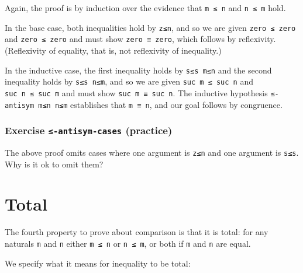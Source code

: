 Again, the proof is by induction over the evidence that \texttt{m\ ≤\ n}
and \texttt{n\ ≤\ m} hold.

In the base case, both inequalities hold by \texttt{z≤n}, and so we are
given \texttt{zero\ ≤\ zero} and \texttt{zero\ ≤\ zero} and must show
\texttt{zero\ ≡\ zero}, which follows by reflexivity. (Reflexivity of
equality, that is, not reflexivity of inequality.)

In the inductive case, the first inequality holds by \texttt{s≤s\ m≤n}
and the second inequality holds by \texttt{s≤s\ n≤m}, and so we are
given \texttt{suc\ m\ ≤\ suc\ n} and \texttt{suc\ n\ ≤\ suc\ m} and must
show \texttt{suc\ m\ ≡\ suc\ n}. The inductive hypothesis
\texttt{≤-antisym\ m≤n\ n≤m} establishes that \texttt{m\ ≡\ n}, and our
goal follows by congruence.

\hypertarget{Relations-leq-antisym-cases}{%
\subsubsection{\texorpdfstring{Exercise \texttt{≤-antisym-cases}
(practice)}{Exercise ≤-antisym-cases (practice)}}\label{Relations-leq-antisym-cases}}

The above proof omits cases where one argument is \texttt{z≤n} and one
argument is \texttt{s≤s}. Why is it ok to omit them?

\begin{fence}
\begin{code}%
\>[0]\<%
\end{code}
\end{fence}

\hypertarget{total}{%
\section{Total}\label{total}}

The fourth property to prove about comparison is that it is total: for
any naturals \texttt{m} and \texttt{n} either \texttt{m\ ≤\ n} or
\texttt{n\ ≤\ m}, or both if \texttt{m} and \texttt{n} are equal.

We specify what it means for inequality to be total:

